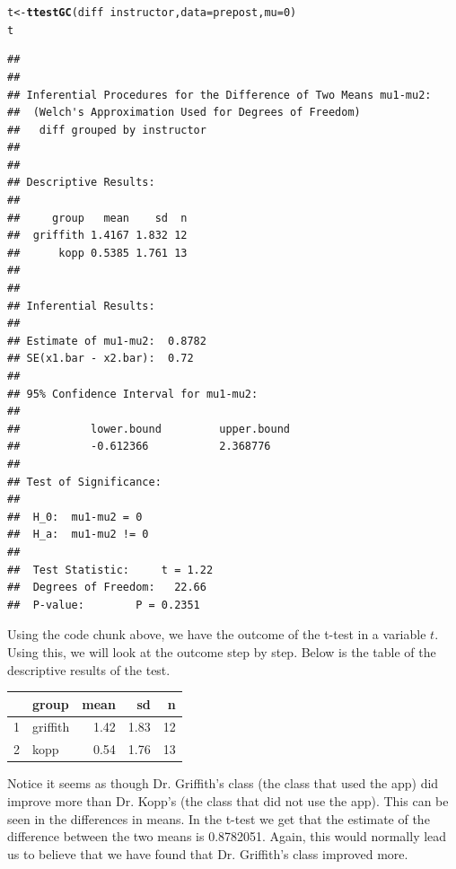 \documentclass[titlepage]{article}\usepackage[]{graphicx}\usepackage[]{color}
\makeatletter
\newcommand{\hlnum}[1]{\textcolor[rgb]{0.686,0.059,0.569}{#1}}%
\newcommand{\hlopt}[1]{\textcolor[rgb]{0,0,0}{#1}}%
\newcommand{\hlstd}[1]{\textcolor[rgb]{0.345,0.345,0.345}{#1}}%
\newcommand{\hlkwb}[1]{\textcolor[rgb]{0.69,0.353,0.396}{#1}}%
\newcommand{\hlkwc}[1]{\textcolor[rgb]{0.333,0.667,0.333}{#1}}%
\newcommand{\hlkwd}[1]{\textcolor[rgb]{0.737,0.353,0.396}{\textbf{#1}}}%
\newenvironment{kframe}{%
 \def\at@end@of@kframe{}%
 \ifinner\ifhmode%
  \def\at@end@of@kframe{\end{minipage}}%
  \begin{minipage}{\columnwidth}%
 \fi\fi%
 \def\FrameCommand##1{\hskip\@totalleftmargin \hskip-\fboxsep
 \colorbox{shadecolor}{##1}\hskip-\fboxsep
     \hskip-\linewidth \hskip-\@totalleftmargin \hskip\columnwidth}%
 \MakeFramed {\advance\hsize-\width
   \@totalleftmargin\z@ \linewidth\hsize
   \@setminipage}}%
 {\par\unskip\endMakeFramed%
 \at@end@of@kframe}
\newenvironment{knitrout}{}{} %
\makeatother
\begin{document}
\begin{knitrout}
\color{fgcolor}\begin{kframe}
\begin{alltt}
\hlstd{t} \hlkwb{<-} \hlkwd{ttestGC}\hlstd{(diff} \hlopt{~} \hlstd{instructor,} \hlkwc{data} \hlstd{= prepost,} \hlkwc{mu} \hlstd{=} \hlnum{0}\hlstd{)}
\hlstd{t}
\end{alltt}
\begin{verbatim}
## 
## 
## Inferential Procedures for the Difference of Two Means mu1-mu2:
## 	(Welch's Approximation Used for Degrees of Freedom)
## 	 diff grouped by instructor 
## 
## 
## Descriptive Results:
## 
##     group   mean    sd  n
##  griffith 1.4167 1.832 12
##      kopp 0.5385 1.761 13
## 
## 
## Inferential Results:
## 
## Estimate of mu1-mu2:	 0.8782 
## SE(x1.bar - x2.bar):	 0.72 
## 
## 95% Confidence Interval for mu1-mu2:
## 
##           lower.bound         upper.bound          
##           -0.612366           2.368776             
## 
## Test of Significance:
## 
## 	H_0:  mu1-mu2 = 0 
## 	H_a:  mu1-mu2 != 0 
## 
## 	Test Statistic:		t = 1.22 
## 	Degrees of Freedom:	  22.66 
## 	P-value:		P = 0.2351
\end{verbatim}
\end{kframe}
\end{knitrout}

Using the code chunk above, we have the outcome of the t-test in a variable \(t\). Using this, we will look at the outcome step by step. Below is the table of the descriptive results of the test.

\bigskip
% 
\begin{tabular}{rlrrr}
  \hline
 & group & mean & sd & n \\ 
  \hline
1 & griffith & 1.42 & 1.83 &  12 \\ 
  2 & kopp & 0.54 & 1.76 &  13 \\ 
   \hline
\end{tabular}

\bigskip

Notice it seems as though Dr. Griffith's class (the class that used the app) did improve more than Dr. Kopp's (the class that did not use the app). This can be seen in the differences in means. In the t-test we get that the estimate of the difference between the two means is 0.8782051. Again, this would normally lead us to believe that we have found that Dr. Griffith's class improved more. 
\end{document}

